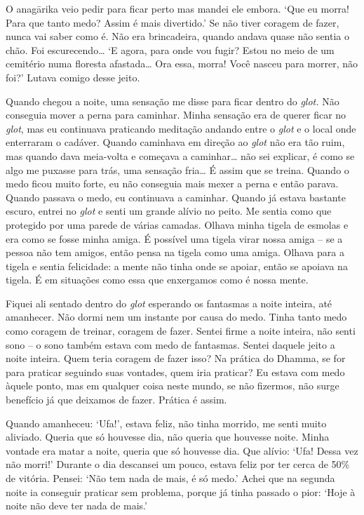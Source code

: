 O anagārika veio pedir para ficar perto mas mandei ele embora. `Que eu
morra! Para que tanto medo? Assim é mais divertido.' Se não tiver
coragem de fazer, nunca vai saber como é. Não era brincadeira, quando
andava quase não sentia o chão. Foi escurecendo\ldots{} `E agora, para
onde vou fugir? Estou no meio de um cemitério numa floresta
afastada\ldots{} Ora essa, morra! Você nasceu para morrer, não foi?'
Lutava comigo desse jeito.

Quando chegou a noite, uma sensação me disse para ficar dentro do
\emph{glot.} Não conseguia mover a perna para caminhar. Minha sensação
era de querer ficar no \emph{glot}, mas eu continuava praticando
meditação andando entre o \emph{glot} e o local onde enterraram o
cadáver. Quando caminhava em direção ao \emph{glot} não era tão ruim,
mas quando dava meia-volta e começava a caminhar\ldots{} não sei
explicar, é como se algo me puxasse para trás, uma sensação fria\ldots{}
É assim que se treina. Quando o medo ficou muito forte, eu não conseguia
mais mexer a perna e então parava. Quando passava o medo, eu continuava
a caminhar. Quando já estava bastante escuro, entrei no \emph{glot} e
senti um grande alívio no peito. Me sentia como que protegido por uma
parede de várias camadas. Olhava minha tigela de esmolas e era como se
fosse minha amiga. É possível uma tigela virar nossa amiga -- se a
pessoa não tem amigos, então pensa na tigela como uma amiga. Olhava para
a tigela e sentia felicidade: a mente não tinha onde se apoiar, então se
apoiava na tigela. É em situações como essa que enxergamos como é nossa
mente.

Fiquei ali sentado dentro do \emph{glot} esperando os fantasmas a noite
inteira, até amanhecer. Não dormi nem um instante por causa do medo.
Tinha tanto medo como coragem de treinar, coragem de fazer. Sentei firme
a noite inteira, não senti sono -- o sono também estava com medo de
fantasmas. Sentei daquele jeito a noite inteira. Quem teria coragem de
fazer isso? Na prática do Dhamma, se for para praticar seguindo suas
vontades, quem iria praticar? Eu estava com medo àquele ponto, mas em
qualquer coisa neste mundo, se não fizermos, não surge benefício já que
deixamos de fazer. Prática é assim.

Quando amanheceu: `Ufa!', estava feliz, não tinha morrido, me senti
muito aliviado. Queria que só houvesse dia, não queria que houvesse
noite. Minha vontade era matar a noite, queria que só houvesse dia. Que
alívio: `Ufa! Dessa vez não morri!' Durante o dia descansei um pouco,
estava feliz por ter cerca de 50\% de vitória. Pensei: `Não tem nada de
mais, é só medo.' Achei que na segunda noite ia conseguir praticar sem
problema, porque já tinha passado o pior: `Hoje à noite não deve ter
nada de mais.'

